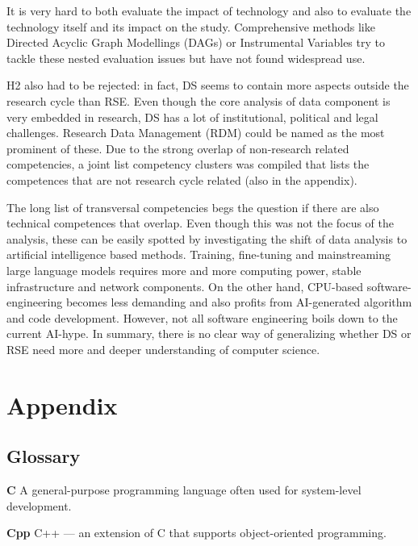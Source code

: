 \documentclass[
        english,biblatex
    ]{lni}
\begin{document}
    It is very hard to both evaluate the impact of technology and also
    to evaluate the technology itself and its impact on the study.
    Comprehensive methods like Directed Acyclic Graph Modellings (DAGs)
    or Instrumental Variables try to tackle these nested evaluation
    issues but have not found widespread use.

    H2 also had to be rejected: in fact, DS seems to contain more
    aspects outside the research cycle than RSE. Even though the core
    analysis of data component is very embedded in research, DS has a
    lot of institutional, political and legal challenges. Research Data
    Management (RDM) could be named as the most prominent of these. Due
    to the strong overlap of non-research related competencies, a joint
    list competency clusters was compiled that lists the competences
    that are not research cycle related (also in the appendix).

    The long list of transversal competencies begs the question if there
    are also technical competences that overlap. Even though this was
    not the focus of the analysis, these can be easily spotted by
    investigating the shift of data analysis to artificial intelligence
    based methods. Training, fine-tuning and mainstreaming large
    language models requires more and more computing power, stable
    infrastructure and network components. On the other hand, CPU-based
    software-engineering becomes less demanding and also profits from
    AI-generated algorithm and code development. However, not all
    software engineering boils down to the current AI-hype. In summary,
    there is no clear way of generalizing whether DS or RSE need more
    and deeper understanding of computer science.

    \printbibliography

    \section{Appendix}\label{sec:appendix}

    \subsection{Glossary}\label{glossary}

    \textbf{C} A general-purpose programming language often used for
    system-level development.

    \textbf{Cpp} C++ --- an extension of C that supports object-oriented
    programming.
\end{document}
